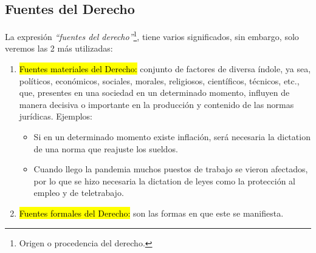 \documentclass{templateApunte}
\newcommand{\hlcolor}[2]{{\sethlcolor{#1}\hl{#2}}}
\begin{document}
\subsection{Fuentes del Derecho}
La expresión \textit{``fuentes del derecho''}\footnote{Origen o procedencia del derecho.}, tiene varios significados, sin embargo, solo veremos las 2 m\'as utilizadas:
\begin{enumerate}
  \item \hlcolor{Verde3!50}{Fuentes materiales del Derecho:} conjunto de factores de diversa \'indole, ya sea, políticos, económicos, sociales, morales, religiosos, científicos, técnicos, etc., que, presentes en una sociedad en un determinado momento, influyen de manera decisiva o importante en la producción y contenido de las normas jurídicas.
  \newline
  Ejemplos:
  \begin{itemize}
    \item Si en un determinado momento existe inflación, ser\'a necesaria la dictation de una norma que reajuste los sueldos.
    \item Cuando llego la pandemia muchos puestos de trabajo se vieron afectados, por lo que se hizo necesaria la dictation de leyes como la protección al empleo y de teletrabajo.
  \end{itemize}

  \item \hlcolor{Verde3!50}{Fuentes formales del Derecho:} son las formas en que este se manifiesta. 
\end{enumerate}
\end{document}
